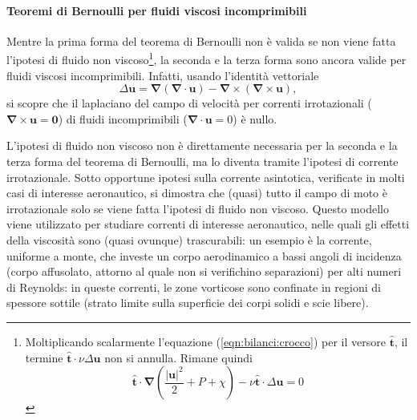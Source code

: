 \paragraph{Teoremi di Bernoulli per fluidi viscosi incomprimibili}
Mentre la prima forma del teorema di Bernoulli non è valida se non viene fatta l'ipotesi di fluido non viscoso\footnote{Moltiplicando scalarmente l'equazione (\ref{eqn:bilanci:crocco}) per il versore $\bm{\hat{t}}$, il termine $\bm{\hat{t}}\cdot \nu \Delta \bm{u}$ non si annulla. Rimane quindi
\begin{equation}
 \bm{\hat{t}} \cdot \bm{\nabla} \left( \frac{|\bm{u}|^2}{2} + P + \chi \right) - \nu \bm{\hat{t}} \cdot \Delta \bm{u} = 0 
\end{equation}
}, la seconda e la terza forma sono ancora valide per fluidi viscosi incomprimibili. Infatti, usando l'identità vettoriale
\begin{equation}
 \Delta \bm{u} = \bm{\nabla} (\bm{\nabla}\cdot \bm{u})
  - \bm{\nabla} \times (\bm{\nabla} \times \bm{u}) ,
\end{equation}
si scopre che il laplaciano del campo di velocità per correnti irrotazionali ($\bm{\nabla} \times \bm{u} = \bm{0}$) di fluidi incomprimibili ($\bm{\nabla} \cdot \bm{u} = 0$) è nullo.
%
\begin{remark}
L'ipotesi di fluido non viscoso non è direttamente necessaria per la seconda e la terza forma del teorema di Bernoulli, ma lo diventa tramite l'ipotesi di corrente irrotazionale. Sotto opportune ipotesi sulla corrente asintotica, verificate in molti casi di interesse aeronautico, si dimostra che (quasi) tutto il campo di moto è  irrotazionale solo se viene fatta l'ipotesi di fluido non viscoso. Questo modello viene utilizzato per studiare correnti di interesse aeronautico, nelle quali gli effetti della viscosità sono (quasi ovunque) trascurabili: un esempio è la corrente, uniforme a monte, che investe un corpo aerodinamico a bassi angoli di incidenza (corpo affusolato, attorno al quale non si verifichino separazioni) per alti numeri di Reynolds: in queste correnti, le zone vorticose sono confinate in regioni di spessore sottile (strato limite sulla superficie dei corpi solidi e scie libere).
\end{remark}




